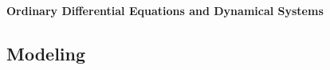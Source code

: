 \documentclass[10pt]{article}
\begin{document}
\footnotesize

\begin{center}
     \Large{\textbf{Ordinary Differential Equations and Dynamical Systems}} \\
\end{center}
\begin{multicols}{2}
\setlength{\premulticols}{1pt}
\setlength{\postmulticols}{1pt}
\setlength{\multicolsep}{1pt}
\setlength{\columnsep}{2pt}
\raggedbottom

\part{Modeling}







\end{multicols}
\end{document}
